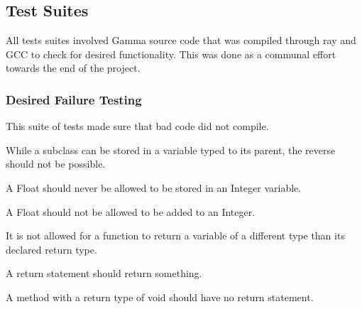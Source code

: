 \setcounter{lstlisting}{0}

\renewcommand{\lstlistingname}{Test Source}
\renewcommand{\lstlistlistingname}{Source Files}

\pagebreak
\subsection{Test Suites}
All tests suites involved Gamma source code that was compiled through ray and GCC to check for desired functionality. This was done as a communal effort towards the end of the project.

\subsubsection{Desired Failure Testing}
This suite of tests made sure that bad code did not compile.



While a subclass can be stored in a variable typed to its parent, the reverse should not be possible.



A Float should never be allowed to be stored in an Integer variable.



A Float should not be allowed to be added to an Integer.



It is not allowed for a function to return a variable of a different type than its declared return type.



A return statement should return something.



A method with a return type of void should have no return statement.



